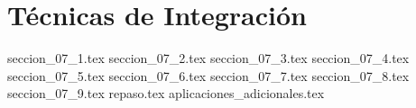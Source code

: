 
\chapter{Técnicas de Integración}

{seccion_07_1.tex}
{seccion_07_2.tex}
{seccion_07_3.tex}
{seccion_07_4.tex}
{seccion_07_5.tex}
{seccion_07_6.tex}
{seccion_07_7.tex}
{seccion_07_8.tex}
{seccion_07_9.tex}
{repaso.tex}
{aplicaciones_adicionales.tex}
